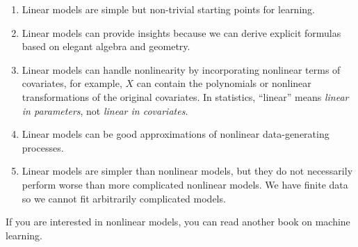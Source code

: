 \begin{enumerate}[label=(R\arabic*), ref=R\arabic*]
\item Linear models are simple but non-trivial starting points for learning.

\item Linear models can provide insights because we can derive explicit
formulas based on elegant algebra and geometry.

\item Linear models can handle nonlinearity by incorporating nonlinear terms of covariates, for example, $X$ can contain the polynomials or nonlinear transformations of the original covariates. In statistics, ``linear'' means {\it linear in parameters}, not {\it linear in covariates}. 



\item Linear models can be good approximations of nonlinear data-generating
processes.
\item Linear models are simpler than nonlinear models, but they do not necessarily
perform worse than more complicated nonlinear models. We have finite data so we cannot fit arbitrarily complicated models. 


\end{enumerate}

If you are interested in nonlinear models, you can read another book on machine learning.

 
